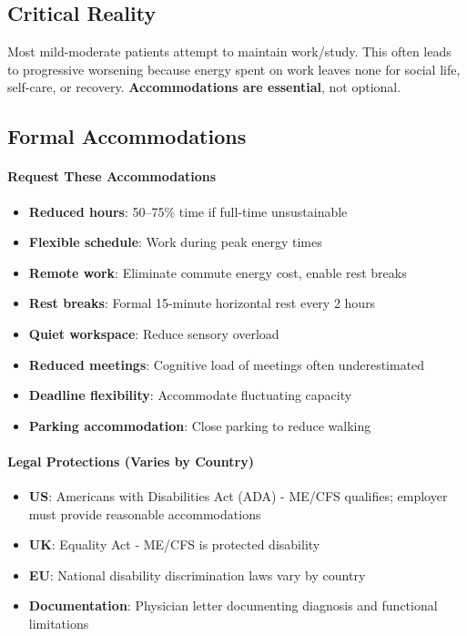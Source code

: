 \subsection{Critical Reality}

Most mild-moderate patients attempt to maintain work/study. This often leads to progressive worsening because energy spent on work leaves none for social life, self-care, or recovery. \textbf{Accommodations are essential}, not optional.

\subsection{Formal Accommodations}

\paragraph{Request These Accommodations}
\begin{itemize}
    \item \textbf{Reduced hours}: 50--75\% time if full-time unsustainable
    \item \textbf{Flexible schedule}: Work during peak energy times
    \item \textbf{Remote work}: Eliminate commute energy cost, enable rest breaks
    \item \textbf{Rest breaks}: Formal 15-minute horizontal rest every 2 hours
    \item \textbf{Quiet workspace}: Reduce sensory overload
    \item \textbf{Reduced meetings}: Cognitive load of meetings often underestimated
    \item \textbf{Deadline flexibility}: Accommodate fluctuating capacity
    \item \textbf{Parking accommodation}: Close parking to reduce walking
\end{itemize}

\paragraph{Legal Protections (Varies by Country)}
\begin{itemize}
    \item \textbf{US}: Americans with Disabilities Act (ADA) - ME/CFS qualifies; employer must provide reasonable accommodations
    \item \textbf{UK}: Equality Act - ME/CFS is protected disability
    \item \textbf{EU}: National disability discrimination laws vary by country
    \item \textbf{Documentation}: Physician letter documenting diagnosis and functional limitations
\end{itemize}

